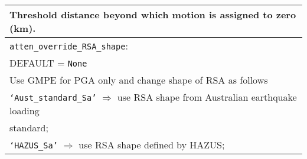 \documentclass[a4paper, 12pt]{report}
\begin{document}
\begin{tabular}{|p{\textwidth}|}
Threshold distance beyond which motion is assigned to zero (km). \\
\hline \vspace{0.1em} \texttt{atten\_override\_RSA\_shape}: \\
DEFAULT = \texttt{None} \\
Use GMPE for PGA only and change shape of RSA as follows\\
 \hspace{0.5em} \texttt{`Aust\_standard\_Sa'} $\Rightarrow$
use RSA shape from Australian earthquake loading \\
\hspace{11em} standard; \\
 \hspace{0.5em} \texttt{`HAZUS\_Sa'}  $\Rightarrow$ use RSA shape defined by HAZUS;\\
\hline
\end{tabular}
\end{document}

